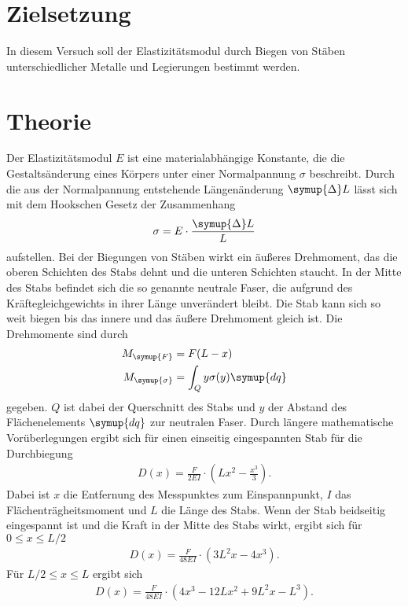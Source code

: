 \section{Zielsetzung}
\label{sec:Zielsetzung}
In diesem Versuch soll der Elastizitätsmodul durch Biegen von Stäben unterschiedlicher Metalle und Legierungen bestimmt werden.

\section{Theorie}
\label{sec:Theorie}
Der Elastizitätsmodul $E$ ist eine materialabhängige Konstante, die die Gestaltsänderung eines Körpers unter einer Normalpannung $\sigma$ beschreibt.
Durch die aus der Normalpannung entstehende Längenänderung $\symup{\Delta} L$ lässt sich mit dem Hookschen Gesetz der Zusammenhang
\begin{align}
    \label{eqn:Elasitizitaetsmodul}
    \sigma = E \cdot \frac{\symup{\Delta} L}{L}
\end{align}
aufstellen. Bei der Biegungen von Stäben wirkt ein äußeres Drehmoment, das die oberen Schichten des Stabs dehnt und die unteren Schichten staucht.
In der Mitte des Stabs befindet sich die so genannte neutrale Faser, die aufgrund des Kräftegleichgewichts in ihrer Länge unverändert bleibt.
Die Stab kann sich so weit biegen bis das innere und das äußere Drehmoment gleich ist. Die Drehmomente sind durch
\begin{align*}
    M_{\symup{F}} &= F(L-x)\\
    M_{\symup{\sigma}} &= \int_{Q} y\sigma(y)\symup{dq}
\end{align*}
gegeben. $Q$ ist dabei der Querschnitt des Stabs und $y$ der Abstand des Flächenelements $\symup{dq}$ zur neutralen Faser.
Durch längere mathematische Vorüberlegungen ergibt sich für einen einseitig eingespannten Stab für die Durchbiegung
\begin{align}
    \label{eqn:Durchbiegung}
    D(x) = \frac{F}{2EI} \cdot\left(Lx^2 - \frac{x^3}{3}\right).
\end{align}
Dabei ist $x$ die Entfernung des Messpunktes zum Einspannpunkt, $I$ das Flächenträgheitsmoment und $L$ die Länge des Stabs.
Wenn der Stab beidseitig eingespannt ist und die Kraft in der Mitte des Stabs wirkt, ergibt sich für $0 \leq x \leq L/2$
\begin{align}
    \label{eqn:DurchbiegungL/2}
    D(x) = \frac{F}{48EI}\cdot \left(3L^2 x - 4x^3\right).
\end{align}
Für $L/2 \leq x \leq L$ ergibt sich
\begin{align}
    \label{eqn:DurchbiegungL}
    D(x) = \frac{F}{48EI}\cdot \left(4x^3 -12Lx^2 +9L^2 x - L^3\right).
\end{align}
